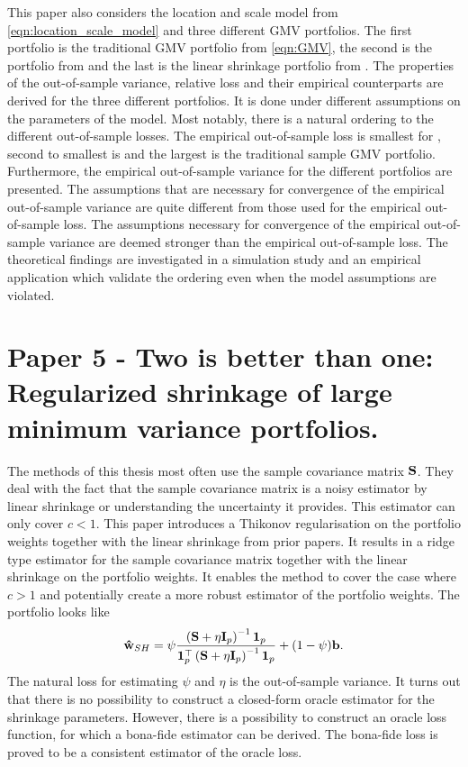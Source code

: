 \documentclass[12pt, oneside]{book}\usepackage{knitr}
\begin{document}
{This paper also considers the location and scale model from \eqref{eqn:location_scale_model} and three different GMV portfolios. 
The first portfolio is the traditional GMV portfolio from \eqref{eqn:GMV}, the second is the portfolio from \citet{bodnar2018estimation} and the last is the linear shrinkage portfolio from \citet{frahm2010}.
The properties of the out-of-sample variance, relative loss and their empirical counterparts are derived for the three different portfolios. 
It is done under different assumptions on the parameters of the model.
Most notably, there is a natural ordering to the different out-of-sample losses.
The empirical out-of-sample loss is smallest for \citet{bodnar2018estimation}, second to smallest is \citet{frahm2010} and the largest is the traditional sample GMV portfolio.
Furthermore, the empirical out-of-sample variance for the different portfolios are presented.
The assumptions that are necessary for convergence of the empirical out-of-sample variance are quite different from those used for the empirical out-of-sample loss.
The assumptions necessary for convergence of the empirical out-of-sample variance are deemed stronger than the empirical out-of-sample loss.
The theoretical findings are investigated in a simulation study and an empirical application which validate the ordering even when the model assumptions are violated.

\section{Paper 5 - Two is better than one: Regularized shrinkage of large
minimum variance portfolios.}\label{sec:paper5}
The methods of this thesis most often use the sample covariance matrix $\mathbf{S}$.
They deal with the fact that the sample covariance matrix is a noisy estimator by linear shrinkage or understanding the uncertainty it provides.
This estimator can only cover $c<1$.
This paper introduces a Thikonov regularisation on the portfolio weights together with the linear shrinkage from prior papers. 
It results in a ridge type estimator for the sample covariance matrix together with the linear shrinkage on the portfolio weights.
It enables the method to cover the case where $c>1$ and potentially create a more robust estimator of the portfolio weights.
The portfolio looks like
$$
\mathbf{\hat{w}}_{SH} = \psi \frac{\left(\mathbf{S} + \eta \mathbf{I}_p \right)^{-1}\mathbf{1}_p}{\mathbf{1}_p^\top\left(\mathbf{S} + \eta \mathbf{I}_p \right)^{-1}\mathbf{1}_p} + (1-\psi)\mathbf{b}.
$$
The natural loss for estimating $\psi$ and $\eta$ is the out-of-sample variance.
It turns out that there is no possibility to construct a closed-form oracle estimator for the shrinkage parameters.
However, there is a possibility to construct an oracle loss function, for which a bona-fide estimator can be derived.
The bona-fide loss is proved to be a consistent estimator of the oracle loss.

}
\end{document}
